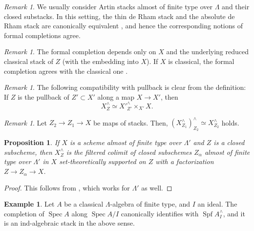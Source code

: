 \documentclass{amsart}
\newtheorem{proposition}[theorem]{Proposition}
\theoremstyle{definition}
\newtheorem{example}[theorem]{Example}
\theoremstyle{remark}
\newtheorem{remark}[theorem]{Remark}
\numberwithin{equation}{section}
\DeclareMathOperator{\Spec}{Spec}
\DeclareMathOperator{\Spf}{Spf}
\begin{document}
\begin{remark}
We usually consider Artin stacks almost of finite type over $\Lambda$ and their closed substacks. 
In this setting, the thin de Rham stack and the absolute de Rham stack are canonically equivalent \cite[Lemma 7.1.15]{ElmantoKubrakSosnilo}, and hence the corresponding notions of formal completions agree. 
\end{remark}

\begin{remark}
The formal completion depends only on $X$ and the underlying reduced classical stack of $Z$ (with the embedding into $X$). If $X$ is classical, the formal completion agrees with the classical one \cite[Corollary 2.1.5]{HalpernLeistnerPreygel}. 
\end{remark}


\begin{remark}{\label{rem: formalcompletionpullback}}
The following compatibility with pullback is clear from the definition: 
If $Z$ is the pullback of $Z'\subset X'$ along a map $X\to X'$, then 
\[
X^\wedge_Z \simeq X'^{\wedge}_{Z'}\times_{X'}X. 
\]
\end{remark}

\begin{remark}
Let $Z_2\to Z_1 \to X$ be maps of stacks. Then, $(X^\wedge_{Z_1})^\wedge_{Z_2}\simeq X^{\wedge}_{Z_2}$ holds. 
\end{remark}

\begin{proposition}
If $X$ is a scheme almost of finite type over $\Lambda'$ and $Z$ is a closed subscheme, then $X^\wedge_Z$ is the filtered colimit of closed subschemes $Z_\alpha$ almost of finite type over $\Lambda'$ in $X$ set-theoretically supported on $Z$ with a factorization $Z\to Z_{\alpha}\to X$. 
\end{proposition}

\begin{proof}
This follows from \cite[Proposition 6.5.5]{GRInd}, which works for $\Lambda'$ as well. 
\end{proof}

\begin{example}
Let $A$ be a classical $\Lambda$-algebra of finite type, and $I$ an ideal. The completion of $\Spec A$ along $\Spec A/I$ canonically identifies with $\Spf A^\wedge_I$, and it is an ind-algebraic stack in the above sense.   
\end{example}
\end{document}
